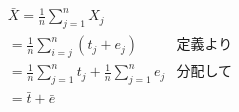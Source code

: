 \begin{align*}
	 & \bar{X}  =  \frac{1}{n}\sum_{j=1}^n X_j                           &             & \mbox{} \\
	 & =  \frac{1}{n}\sum_{i=j}^n (t_j + e_j)                            & \mbox{定義より}           \\
	 & =  \frac{1}{n} \sum_{j=1}^n  t_j +  \frac{1}{n} \sum_{j=1}^n  e_j & \mbox{分配して}           \\
	 & =  \bar{t} + \bar{e}                                              & \mbox{}               \\
\end{align*}
